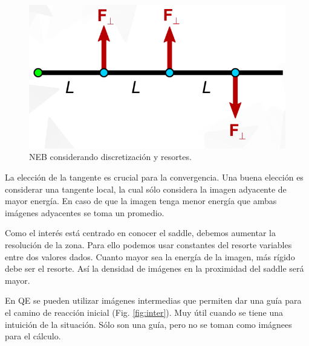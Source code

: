   \begin{figure}[H]
      \centering
      \includegraphics[scale = 0.4]{figs/D3/disc_a.png}
      \caption{NEB considerando discretización y resortes.}
      \label{fig:NEB_disc}
  \end{figure}

  La elección de la tangente es crucial para la convergencia. Una buena elección es considerar una tangente local, la cual sólo considera la imagen adyacente de mayor energía. En caso de que la imagen tenga menor energía que ambas imágenes adyacentes se toma un promedio.

  Como el interés está centrado en conocer el saddle, debemos aumentar la resolución de la zona. Para ello podemos usar constantes del resorte variables entre dos valores dados. Cuanto mayor sea la energía de la imagen, más rígido debe ser el resorte. Así la densidad de imágenes en la proximidad del saddle será mayor.

  En QE se pueden utilizar imágenes intermedias que permiten dar una guía para el camino de reacción inicial (Fig. \ref{fig:inter}). Muy útil cuando se tiene una intuición de la situación. Sólo son una guía, pero no se toman como imágnees para el cálculo.

